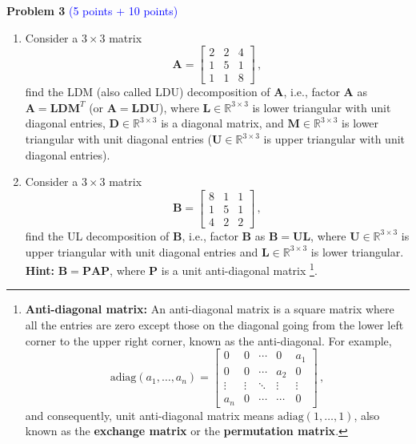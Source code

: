 \documentclass[english,onecolumn]{IEEEtran}
\begin{document}
\newpage
\noindent\textbf{Problem 3} \textcolor{blue}{(5 points + 10 points)}
\begin{enumerate}
	\item Consider a $3\times 3$ matrix
	\[
	\mathbf{A} = \begin{bmatrix}
		2& 2&4 \\
		1&5&1\\
		1&1&8
	\end{bmatrix}\,,
	\] find the LDM (also called LDU) decomposition of $\mathbf{A}$, i.e., factor $\mathbf{A}$ as $\mathbf{A}=\mathbf{L}\mathbf{D}\mathbf{M}^T$ (or $\mathbf{A}=\mathbf{L}\mathbf{D}\mathbf{U}$), where $\mathbf{L}\in\mathbb{R}^{3\times 3}$ is lower triangular with unit diagonal entries, $\mathbf{D}\in\mathbb{R}^{3\times 3}$  is  a diagonal matrix, and $\mathbf{M}\in\mathbb{R}^{3\times 3}$ is lower triangular with unit diagonal entries ($\mathbf{U}\in\mathbb{R}^{3\times 3}$ is upper triangular with unit diagonal entries).
	
	\item Consider a $3\times 3$ matrix
	\[
	\mathbf{B} = \begin{bmatrix}
		8& 1&1 \\
		1&5&1\\
		4&2&2
	\end{bmatrix}\,,
	\] find the UL decomposition  of $\mathbf{B}$, 
	i.e., factor $\mathbf{B}$ as $\mathbf{B} = \mathbf{UL}$,
	where $\mathbf{U}\in\mathbb{R}^{3\times 3}$ is upper triangular with unit diagonal entries and $\mathbf{L}\in\mathbb{R}^{3\times 3}$ is lower triangular.\\
	\textbf{Hint:}  $\mathbf{B}=\mathbf{P}\mathbf{A}\mathbf{P}$, where $\mathbf{P}$ is a unit anti-diagonal matrix \footnote{{\textbf{Anti-diagonal matrix:} An anti-diagonal matrix is a square matrix where all the entries are zero except those on the diagonal going from the lower left corner to the upper right corner, known as the anti-diagonal. For example, 
			\[
			\text{adiag}(a_1,\ldots,a_n) = \begin{bmatrix}
				0 & 0 & \cdots & 0 & a_1 \\
				0 & 0 & \cdots  & a_2 & 0 \\
				\vdots &  \vdots & \ddots & \vdots &\vdots \\
				a_n & 0 & \cdots &  \cdots& 0
			\end{bmatrix}\,,
			\]
			and consequently, unit anti-diagonal matrix means $\text{adiag}(1,\ldots,1)$, also known as the \textbf{exchange matrix} or the \textbf{permutation matrix}. 
	}}.
\end{enumerate}
\end{document}
